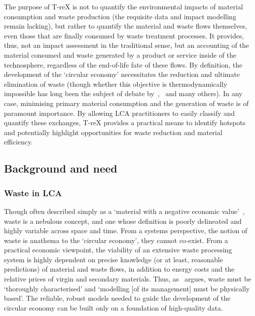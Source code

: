 The purpose of T-reX is not to quantify the environmental impacts of material consumption and waste production (the requisite data and impact modelling remain lacking), but rather to quantify the material and waste flows themselves, even those that are finally consumed by waste treatment processes. It provides, thus, not an impact assessment in the traditional sense, but an accounting of the material consumed and waste generated by a product or service inside of the technosphere, regardless of the end-of-life fate of these flows. By definition, the development of the `circular economy' necessitates the reduction and ultimate elimination of waste (though whether this objective is thermodynamically impossible has long been the subject of debate by~\cite{ayres1998recycling},~\cite{reuter2012recyclinglimits} and many others). In any case, minimising primary material consumption and the generation of waste is of paramount importance. By allowing LCA practitioners to easily classify and quantify these exchanges, T-reX provides a practical means to identify hotspots and potentially highlight opportunities for waste reduction and material efficiency.

\subsection{Background and need}\label{sec:intro-background}
\subsubsection{Waste in LCA}\label{sec:intro-waste}

Though often described simply as a `material with a negative economic value'~\citep{guinee2004economicallocation}, waste is a nebulous concept, and one whose definition is poorly delineated and highly variable across space and time. From a systems perspective, the notion of waste is anathema to the `circular economy', they cannot co-exist. From a practical economic viewpoint, the viability of an extensive waste processing system is highly dependent on precise knowledge (or at least, reasonable predictions) of material and waste flows, in addition to energy costs and the relative prices of virgin and secondary materials. Thus, as~\cite{bisinella2024wastelca} argues, waste must be `thoroughly characterised' and `modelling [of its management] must be physically based'. The reliable, robust models needed to guide the development of the circular economy can be built only on a foundation of high-quality data.

